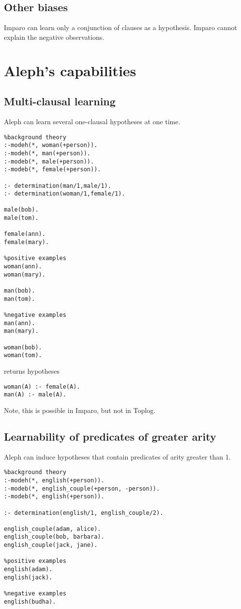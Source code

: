 \subsection{Other biases}
Imparo can learn only a conjunction of clauses as a hypothesis.
Imparo cannot explain the negative observations.

\section{Aleph's capabilities}

\subsection{Multi-clausal learning}
Aleph can learn several one-clausal hypotheses at one time.

\begin{lstlisting}
%background theory
:-modeh(*, woman(+person)).
:-modeh(*, man(+person)).
:-modeb(*, male(+person)).
:-modeb(*, female(+person)).

:- determination(man/1,male/1).
:- determination(woman/1,female/1).

male(bob).
male(tom).

female(ann).
female(mary).

%positive examples
woman(ann).
woman(mary).

man(bob).
man(tom).

%negative examples
man(ann).
man(mary).

woman(bob).
woman(tom).
\end{lstlisting}

returns hypotheses

\begin{lstlisting}
woman(A) :- female(A).
man(A) :- male(A).
\end{lstlisting}

Note, this is possible in Imparo, but not in Toplog.

\subsection{Learnability of predicates of greater arity}
Aleph can induce hypotheses that contain predicates of arity greater than 1.
\begin{lstlisting}
%background theory
:-modeh(*, english(+person)).
:-modeb(*, english_couple(+person, -person)).
:-modeb(*, english(+person)).

:- determination(english/1, english_couple/2).

english_couple(adam, alice).
english_couple(bob, barbara).
english_couple(jack, jane).

%positive examples
english(adam).
english(jack).

%negative examples
english(budha).
\end{lstlisting}

